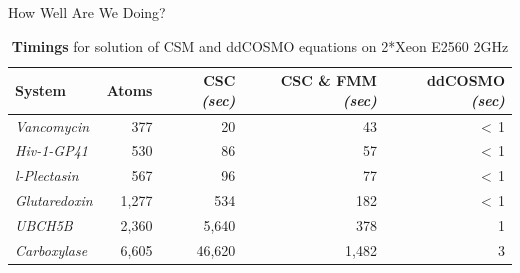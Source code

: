 \begin{frame}{How Well Are We Doing?}
{{\footnotesize
\begin{center}
\begin{table}
	\begin{tabular}{ lrrrr  }
\toprule[0.1em] 
{\bf System}	& {\bf Atoms}	& {\bf CSC} {\sl(sec)} & {\bf CSC \& FMM} {\sl(sec)} & {\bf ddCOSMO} {\sl(sec)} \\
\midrule[0.08em]
{\sl Vancomycin}	& 377	& 20  	& 43 		&  \cellcolor{YellowGreen} $<\,$1 \\
{\sl Hiv-1-GP41} 	& 530	& 86		& 57 		& \cellcolor{YellowGreen}$<\,$1 \\
{\sl l-Plectasin} 		& 567	& 96		& 77		& \cellcolor{YellowGreen}$<\,$1 \\
{\sl Glutaredoxin} 	& 1,277 	& 534 	& 182 	& \cellcolor{YellowGreen}$<\,$1 \\
{\sl UBCH5B}		& 2,360 	& 5,640	& 378 	& \cellcolor{YellowGreen}1 \\
{\sl Carboxylase} 	& 6,605	& 46,620 	& 1,482	& \cellcolor{YellowGreen}3 \\
\bottomrule[0.1em]
	\end{tabular}
		\caption{\scriptsize {\bf Timings} for solution of CSM and ddCOSMO equations on 2*Xeon E2560 2GHz}
		\end{table}
\end{center}
}

}


\end{frame}


